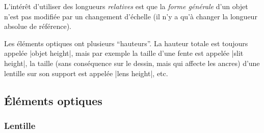 \documentclass[a4paper]{ltxdoc}
\begin{document}
L'intérêt d'utiliser des longueurs \emph{relatives} est que la \emph{forme générale} d'un objet n'est pas modifiée par un changement d'échelle (il n'y a qu'à changer la longueur absolue de référence).

Les éléments optiques ont plusieurs \enquote{hauteurs}. La hauteur totale est toujours appelée |objet height|, mais par exemple la taille d'une fente est appelée |slit height|, la taille (sans conséquence sur le dessin, mais qui affecte les ancres) d'une lentille sur son support est appelée |lens height|, etc. 



\subsection{Éléments optiques}

\subsubsection{Lentille}
\end{document}
